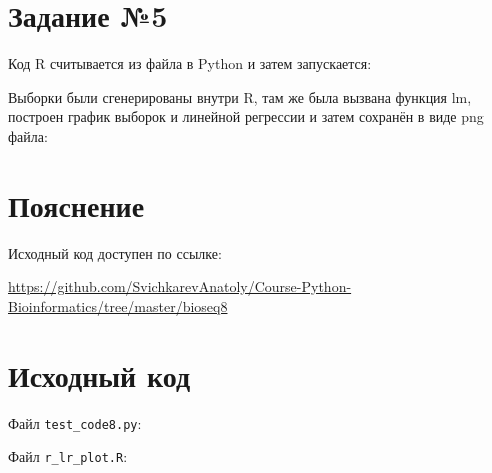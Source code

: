 \documentclass{article} %
\begin{document}
\section{Задание №5}
Код R считывается из файла в Python и затем запускается:

\newpage
Выборки были сгенерированы внутри R, там же была вызвана функция lm, построен график выборок и линейной регрессии и затем сохранён в виде png файла:

\noindent{}

\section{Пояснение}
Исходный код доступен по ссылке:

\href{https://github.com/SvichkarevAnatoly/Course-Python-Bioinformatics/tree/master/bioseq7}{https://github.com/SvichkarevAnatoly/Course-Python-Bioinformatics/tree/master/bioseq8}

\section{Исходный код}
Файл \verb$test_code8.py$:


Файл \verb$r_lr_plot.R$:

\end{document}
